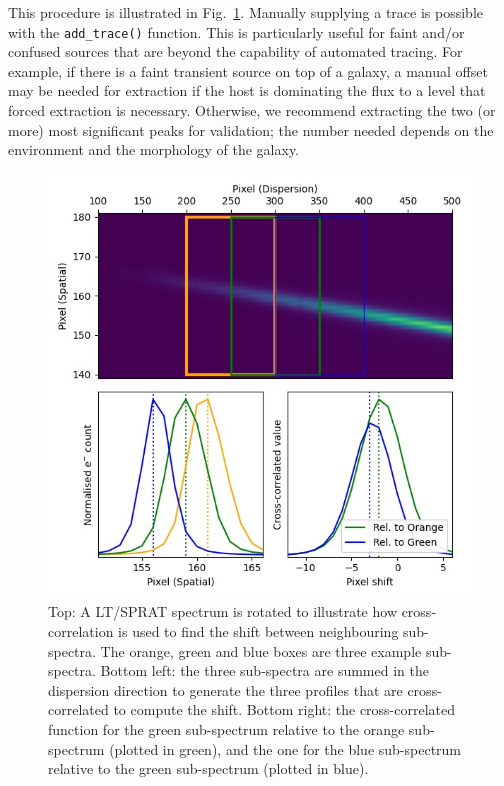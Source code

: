 \documentclass[fleqn,usenatbib]{mnras}
\begin{document}
This procedure is illustrated in Fig.~\ref{fig:trace}. Manually
supplying a trace is possible with the \texttt{add\_trace()}
function. This is particularly useful for faint and/or confused
sources that are beyond the capability of automated tracing. For
example, if there is a faint transient source on top of a galaxy,
a manual offset may be needed for extraction if the host is
dominating the flux to a level that forced extraction is necessary.
Otherwise, we recommend extracting the two (or more) most significant
peaks for validation; the number needed depends on
the environment and the morphology of the galaxy.

\begin{figure}
    \centering
    \includegraphics[width=\columnwidth]{fig_01_tracing.jpg}
    \caption{Top: A LT/SPRAT spectrum is rotated to illustrate how
    cross-correlation is used to find the shift between neighbouring
    sub-spectra. The orange, green and blue boxes are three example
    sub-spectra. Bottom left: the three sub-spectra are summed in
    the dispersion direction to generate the three profiles that are
    cross-correlated to compute the shift. Bottom right: the
    cross-correlated function for the green sub-spectrum relative
    to the orange sub-spectrum (plotted in green), and the one
    for the blue sub-spectrum relative to the green sub-spectrum
    (plotted in blue).}
    \label{fig:trace}
\end{figure}
\end{document}
